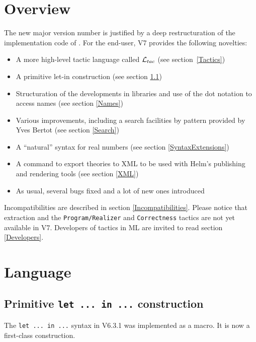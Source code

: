 \documentclass[11pt]{article}
\begin{document}


\def\ltac{{\cal L}_{tac}}

\section*{Overview}

The new major version number is justified by a deep restructuration of
the implementation code of \Coq. For the end-user, {\Coq}
V7 provides the following novelties:

\begin{itemize}
\item A more high-level tactic language called $\ltac$ (see
section~\ref{Tactics})
\item A primitive let-in construction (see section \ref{Letin})
\item Structuration of the developments in libraries and use of the
dot notation to access names (see section \ref{Names})
\item Various improvements, including a search facilities by pattern
provided by Yves Bertot (see section \ref{Search})
\item A ``natural'' syntax for real numbers (see section
\ref{SyntaxExtensions}) 
\item A command to export theories to XML to
be used with Helm's publishing and rendering tools (see section \ref{XML})
\item As usual, several bugs fixed and a lot of new ones introduced
\end{itemize}

Incompatibilities are described in section
\ref{Incompatibilities}. Please notice that extraction and the
{\tt Program/Realizer} and {\tt Correctness} tactics are not yet available in {\Coq} V7.
Developers of tactics in ML are invited to read section
\ref{Developers}.

\section{Language}

\label{Language}
\subsection{Primitive {\tt let ... in ...} construction}
\label{Letin}
The {\tt let ... in ...} syntax in V6.3.1 was implemented as a
macro. It is now a first-class construction.
\end{document}
